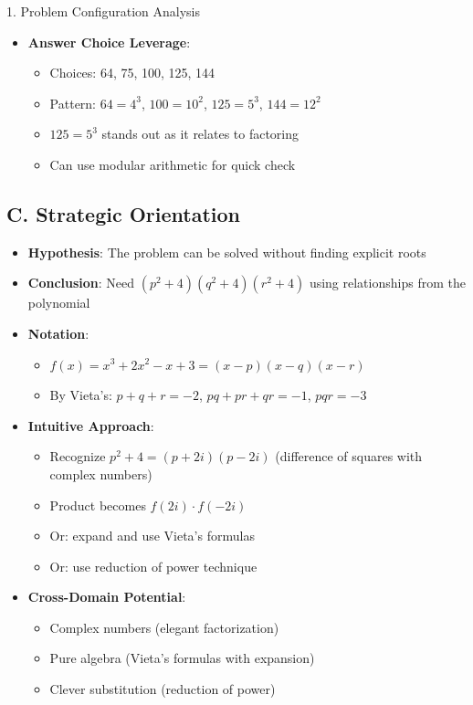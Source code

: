 \documentclass[12pt]{article}
\begin{document}
\begin{configbox}{1. Problem Configuration Analysis}
\begin{itemize}[leftmargin=*]
    \item \textbf{Answer Choice Leverage}: 
    \begin{itemize}
        \item Choices: 64, 75, 100, 125, 144
        \item Pattern: $64 = 4^3$, $100 = 10^2$, $125 = 5^3$, $144 = 12^2$
        \item $125 = 5^3$ stands out as it relates to factoring
        \item Can use modular arithmetic for quick check
    \end{itemize}
\end{itemize}

\subsection*{C. Strategic Orientation}
\begin{itemize}[leftmargin=*]
    \item \textbf{Hypothesis}: The problem can be solved without finding explicit roots
    
    \item \textbf{Conclusion}: Need $(p^2 + 4)(q^2 + 4)(r^2 + 4)$ using relationships from the polynomial
    
    \item \textbf{Notation}: 
    \begin{itemize}
        \item $f(x) = x^3 + 2x^2 - x + 3 = (x - p)(x - q)(x - r)$
        \item By Vieta's: $p + q + r = -2$, $pq + pr + qr = -1$, $pqr = -3$
    \end{itemize}
    
    \item \textbf{Intuitive Approach}: 
    \begin{itemize}
        \item Recognize $p^2 + 4 = (p + 2i)(p - 2i)$ (difference of squares with complex numbers)
        \item Product becomes $f(2i) \cdot f(-2i)$
        \item Or: expand and use Vieta's formulas
        \item Or: use reduction of power technique
    \end{itemize}
    
    \item \textbf{Cross-Domain Potential}: 
    \begin{itemize}
        \item Complex numbers (elegant factorization)
        \item Pure algebra (Vieta's formulas with expansion)
        \item Clever substitution (reduction of power)
    \end{itemize}
\end{itemize}

\end{configbox}
\end{document}
